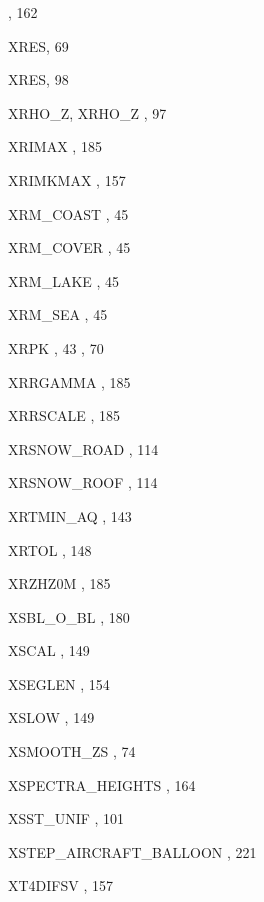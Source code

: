\begin{theindex}
    \subitem {},  162
  \item XRES, 69
  \item XRES, 98
  \item XRHO\_Z, XRHO\_Z
    \subitem {},  97
  \item XRIMAX
    \subitem {},  185
  \item XRIMKMAX
    \subitem {},  157
  \item XRM\_COAST
    \subitem {},  45
  \item XRM\_COVER
    \subitem {},  45
  \item XRM\_LAKE
    \subitem {},  45
  \item XRM\_SEA
    \subitem {},  45
  \item XRPK
    \subitem {},  43
    \subitem {},  70
  \item XRRGAMMA
    \subitem {},  185
  \item XRRSCALE
    \subitem {},  185
  \item XRSNOW\_ROAD
    \subitem {},  114
  \item XRSNOW\_ROOF
    \subitem {},  114
  \item XRTMIN\_AQ
    \subitem {},  143
  \item XRTOL
    \subitem {},  148
  \item XRZHZ0M
    \subitem {},  185
  \item XSBL\_O\_BL
    \subitem {},  180
  \item XSCAL 
    \subitem {},  149
  \item XSEGLEN
    \subitem {},  154
  \item XSLOW
    \subitem {},  149
  \item XSMOOTH\_ZS
    \subitem {},  74
  \item XSPECTRA\_HEIGHTS
    \subitem {},  164
  \item XSST\_UNIF
    \subitem {},  101
  \item XSTEP\_AIRCRAFT\_BALLOON
    \subitem {},  221
  \item XT4DIFSV
    \subitem {},  157

\end{theindex}

